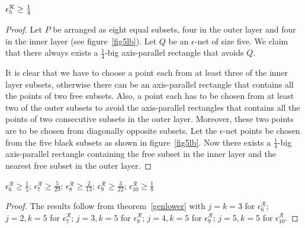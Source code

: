 \begin{lem}
 $\epsilon^{\cal{R}}_5 \geq \frac{1}{4}$ 
\end{lem}
\begin{proof}
Let $P$ be
arranged as eight equal subsets, four in the outer layer and four in the
inner layer (see figure~\ref{fig5lb}). Let $Q$ be an $\epsilon$-net of size five. We claim that there always exists a $\frac{1}{4}$-big axis-parallel rectangle that avoids $Q$.  

It is clear that we have to choose a point each from at least three of the inner
layer subsets, otherwise there can be an axis-parallel rectangle that contains
all the points of two free subsets. Also, a point each has to be chosen from
at least two of the outer subsets to avoid the axis-parallel rectangles
that contains all the points of two consecutive subsets in the outer layer. 
Moreover, these two points are to be chosen from diagonally opposite subsets. Let the $\epsilon$-net points be chosen from the five black subsets as shown in figure~\ref{fig5lb}. Now there exists a $\frac{1}{4}$-big axis-parallel rectangle containing the free subset in the
inner layer and the nearest free subset in the outer layer.


\end{proof}

\begin{lem}
$\epsilon_6^{\mathcal{R}} \ge \frac{1}{5}$; $\epsilon_7^{\mathcal{R}} \ge
\frac{5}{29}$; $\epsilon_8^{\mathcal{R}} \ge \frac{2}{13}$;
$\epsilon_9^{\mathcal{R}} \ge \frac{3}{22}$; $\epsilon_{10}^{\mathcal{R}} \ge
\frac{1}{8}$
\end{lem}

\begin{proof}
 The results follow from theorem~\ref{genlower} with $j=k=3$ for
$\epsilon_6^{\mathcal{R}}$;
$j=2, k=5$ for $\epsilon_7^{\mathcal{R}}$; $j=3, k=5$ for
$\epsilon_8^{\mathcal{R}}$; $j=4, k=5$ for $\epsilon_9^{\mathcal{R}}$;
$j=5, k=5$ for $\epsilon_{10}^{\mathcal{R}}$. 
\end{proof}

